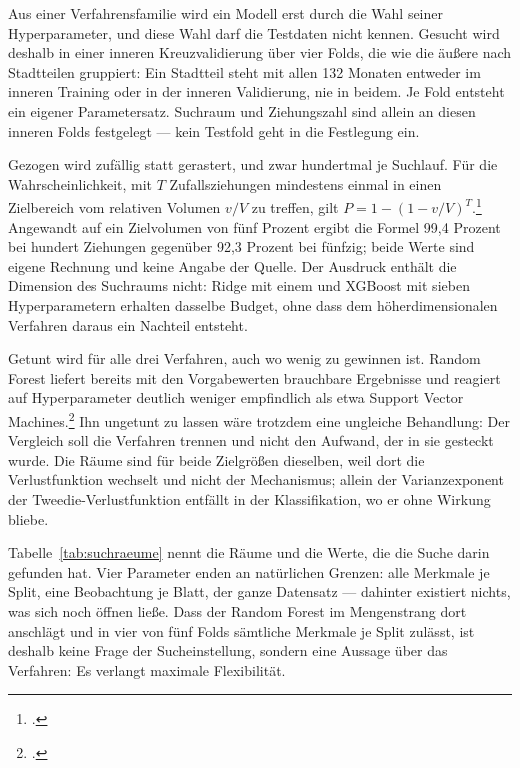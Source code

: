 \documentclass[12pt,a4paper]{article}
\begin{document}

Aus einer Verfahrensfamilie wird ein Modell erst durch die Wahl seiner
Hyperparameter, und diese Wahl darf die Testdaten nicht kennen. Gesucht wird
deshalb in einer inneren Kreuzvalidierung über vier Folds, die wie die äußere
nach Stadtteilen gruppiert: Ein Stadtteil steht mit allen 132 Monaten entweder
im inneren Training oder in der inneren Validierung, nie in beidem. Je Fold
entsteht ein eigener Parametersatz. Suchraum und Ziehungszahl sind allein an
diesen inneren Folds festgelegt --- kein Testfold geht in die Festlegung ein.

Gezogen wird zufällig statt gerastert, und zwar hundertmal je Suchlauf. Für
die Wahrscheinlichkeit, mit $T$ Zufallsziehungen mindestens einmal in einen
Zielbereich vom relativen Volumen $v/V$ zu treffen, gilt
$P = 1-(1-v/V)^{T}$.\footcite[296]{Bergstra2012} Angewandt auf ein Zielvolumen
von fünf Prozent ergibt die Formel 99,4 Prozent bei hundert Ziehungen
gegenüber 92,3 Prozent bei fünfzig; beide Werte sind eigene Rechnung und keine
Angabe der Quelle. Der Ausdruck enthält die Dimension des Suchraums nicht:
Ridge mit einem und XGBoost mit sieben Hyperparametern erhalten dasselbe
Budget, ohne dass dem höherdimensionalen Verfahren daraus ein Nachteil
entsteht.

Getunt wird für alle drei Verfahren, auch wo wenig zu gewinnen ist. Random
Forest liefert bereits mit den Vorgabewerten brauchbare Ergebnisse und
reagiert auf Hyperparameter deutlich weniger empfindlich als etwa Support
Vector Machines.\footcite[13]{Probst2019} Ihn ungetunt zu lassen wäre
trotzdem eine ungleiche Behandlung: Der Vergleich soll die Verfahren trennen
und nicht den Aufwand, der in sie gesteckt wurde. Die Räume sind für beide
Zielgrößen dieselben, weil dort die Verlustfunktion wechselt und nicht der
Mechanismus; allein der Varianzexponent der Tweedie-Verlustfunktion entfällt
in der Klassifikation, wo er ohne Wirkung bliebe.

Tabelle~\ref{tab:suchraeume} nennt die Räume und die Werte, die die Suche
darin gefunden hat. Vier Parameter enden an natürlichen Grenzen: alle Merkmale
je Split, eine Beobachtung je Blatt, der ganze Datensatz --- dahinter
existiert nichts, was sich noch öffnen ließe. Dass der Random Forest im
Mengenstrang dort anschlägt und in vier von fünf Folds sämtliche Merkmale je
Split zulässt, ist deshalb keine Frage der Sucheinstellung, sondern eine
Aussage über das Verfahren: Es verlangt maximale Flexibilität.
\end{document}
